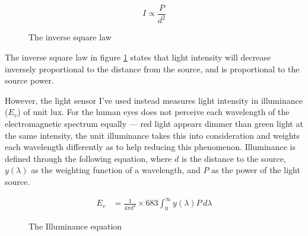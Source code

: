 \documentclass[a4paper,12pt]{article}
\begin{document}



\begin{figure}[h!]
    \[
    I \propto \frac{P}{d^2}
    \]
    \caption{The inverse square law}
    \label{eq:isl}
\end{figure}

The inverse square law in figure \ref{eq:isl} states that light intensity will decrease inversely proportional to the distance from the source, and is proportional to the source power.

However, the light sensor I've used instead measures light intensity in illuminance ($E_v$) of unit lux. For the human eyes does not perceive each wavelength of the electromagnetic spectrum equally --- red light appears dimmer than green light at the same intensity, the unit illuminance takes this into consideration and weights each wavelength differently as to help reducing this phenomenon. Illuminance is defined through the following equation, where $d$ is the distance to the source, $y(\lambda)$ as the weighting function of a wavelength, and $P$ as the power of the light source.

\begin{figure}[h!]
    \centering
    \begin{align*}
        E_v &= \frac{1}{4\pi d^2} \times 683 \int_{0}^{\infty} y(\lambda) P \, d\lambda
    \end{align*}
    \caption{The Illuminance equation}
    \label{eq:dti}
\end{figure}
\end{document}
